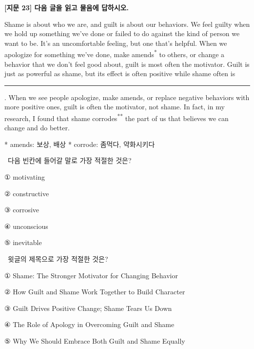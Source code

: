 \documentclass[11pt,a4paper]{article}
\newcommand{\qno}[1]{\par\vspace{8pt}\noindent{\sffamily\bfseries #1.}\ }
\newcommand{\instr}[1]{{\sffamily #1}\par\vspace{3pt}}
\begin{document}
\begin{center}
{\fontsize{15}{17}\selectfont\sffamily\bfseries [지문 23] 다음 글을 읽고 물음에 답하시오.}
\end{center}
\vspace{4pt}

\begin{pbox}
Shame is about who we are, and guilt is about our behaviors. We feel guilty when we hold up something we've done or failed to do against the kind of person we want to be. It's an uncomfortable feeling, but one that's helpful. When we apologize for something we've done, make amends\textsuperscript{*} to others, or change a behavior that we don't feel good about, guilt is most often the motivator. Guilt is just as powerful as shame, but its effect is often positive while shame often is \rule{3cm}{0.4pt}. When we see people apologize, make amends, or replace negative behaviors with more positive ones, guilt is often the motivator, not shame. In fact, in my research, I found that shame corrodes\textsuperscript{**} the part of us that believes we can change and do better.

\vspace{4pt}
\noindent\small{* amends: 보상, 배상 \quad ** corrode: 좀먹다, 약화시키다}
\end{pbox}

\qno{1}\instr{다음 빈칸에 들어갈 말로 가장 적절한 것은?}
\begin{choices}
\item ① motivating
\item ② constructive
\item ③ corrosive
\item ④ unconscious
\item ⑤ inevitable
\end{choices}

\qno{2}\instr{윗글의 제목으로 가장 적절한 것은?}
\begin{choices}
\item ① Shame: The Stronger Motivator for Changing Behavior
\item ② How Guilt and Shame Work Together to Build Character
\item ③ Guilt Drives Positive Change; Shame Tears Us Down
\item ④ The Role of Apology in Overcoming Guilt and Shame
\item ⑤ Why We Should Embrace Both Guilt and Shame Equally
\end{choices}
\end{document}
